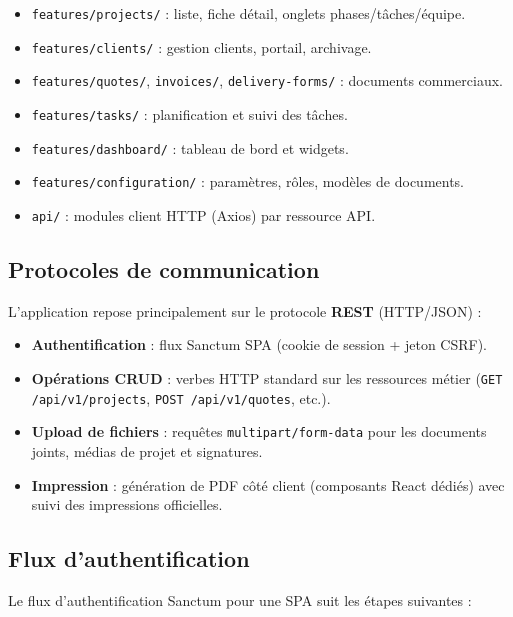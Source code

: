 \begin{itemize}
  \item \texttt{features/projects/} : liste, fiche détail, onglets phases/tâches/équipe.
  \item \texttt{features/clients/} : gestion clients, portail, archivage.
  \item \texttt{features/quotes/}, \texttt{invoices/}, \texttt{delivery-forms/} :
  documents commerciaux.
  \item \texttt{features/tasks/} : planification et suivi des tâches.
  \item \texttt{features/dashboard/} : tableau de bord et widgets.
  \item \texttt{features/configuration/} : paramètres, rôles, modèles de documents.
  \item \texttt{api/} : modules client HTTP (Axios) par ressource API.
\end{itemize}

\subsection{Protocoles de communication}

L'application repose principalement sur le protocole \textbf{REST} (HTTP/JSON) :

\begin{itemize}
  \item \textbf{Authentification} : flux Sanctum SPA (cookie de session + jeton CSRF).
  \item \textbf{Opérations CRUD} : verbes HTTP standard sur les ressources métier
  (\texttt{GET /api/v1/projects}, \texttt{POST /api/v1/quotes}, etc.).
  \item \textbf{Upload de fichiers} : requêtes \texttt{multipart/form-data} pour les
  documents joints, médias de projet et signatures.
  \item \textbf{Impression} : génération de PDF côté client (composants React dédiés)
  avec suivi des impressions officielles.
\end{itemize}

\subsection{Flux d'authentification}

Le flux d'authentification Sanctum pour une SPA suit les étapes suivantes :

